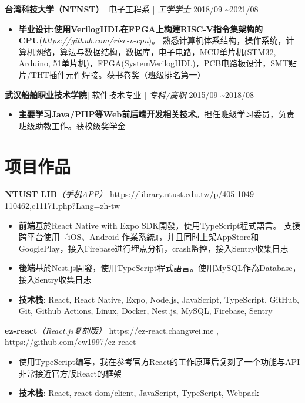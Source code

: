\documentclass{resume}
\newcommand{\iconsection}[2]{
  \section[\texorpdfstring{#2}{#2}]{\faIcon{#1}\quad #2}
}
\begin{document}
  \datedsubsection
  {\textbf{台湾科技大学（NTNST）}| 电子工程系 | \textit{工学学士}}
  {2018/09 \textasciitilde 2021/08}
  \begin{itemize}
    \item \textbf{毕业设计:使用VerilogHDL在FPGA上构建RISC-V指令集架构的CPU}(\textit{https://github.com/risc-v-cpu})。
    熟悉计算机体系结构，操作系统，计算机网络，算法与数据结构，数据库，电子电路，MCU单片机(STM32, Arduino, 51单片机)，FPGA(SystemVerilogHDL)，PCB电路板设计，SMT贴片/THT插件元件焊接。获书卷奖（班级排名第一）
  \end{itemize}

  \datedsubsection
  {\textbf{武汉船舶职业技术学院}| 软件技术专业 | \textit{专科/高职}}
  {2015/09 \textasciitilde 2018/08}
  \begin{itemize}
    \item \textbf{主要学习Java/PHP等Web前后端开发相关技术}。担任班级学习委员，负责班级助教工作。获校级奖学金
  \end{itemize}

  \iconsection{list}{项目作品}

  \datedsubsection
  {\textbf{NTUST LIB}\textit{（手机APP）}}
  {https://library.ntust.edu.tw/p/405-1049-110462,c11171.php?Lang=zh-tw}
  \begin{itemize}
    \item \textbf{前端}基於React Native with Expo SDK開發，使用TypeScript程式語言。
    支援跨平台使用『iOS、Android 作業系統』，并且同时上架AppStore和GooglePlay，接入Firebase进行埋点分析，crash监控，接入Sentry收集日志
    \item \textbf{後端}基於Nest.js開發，使用TypeScript程式語言。使用MySQL作為Database，接入Sentry收集日志
    \item \textbf{技术栈}: React, React Native, Expo, Node.js, JavaScript, TypeScript, GitHub, Git, Github Actions, Linux, Docker, Nest.js, MySQL, Firebase, Sentry
  \end{itemize}

  \datedsubsection
  {\textbf{ez-react}\textit{（React.js复刻版）}}
  {https://ez-react.changwei.me , https://github.com/cw1997/ez-react}
  \begin{itemize}
    \item 使用TypeScript编写，我在参考官方React的工作原理后复刻了一个功能与API非常接近官方版React的框架
    \item \textbf{技术栈}: React, react-dom/client, JavaScript, TypeScript, Webpack
  \end{itemize}
\end{document}
